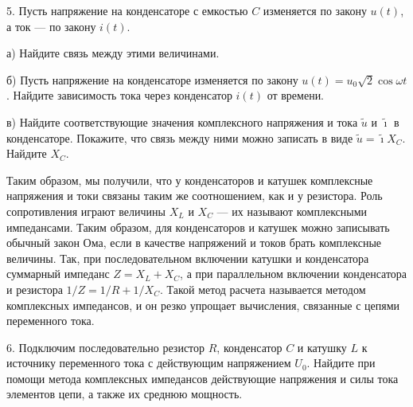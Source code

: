 \documentclass[14pt]{article}
\begin{document}
5. Пусть напряжение на конденсаторе с емкостью $C$ изменяется по закону $u(t)$, а ток --- по закону $i(t)$.

а) Найдите связь между этими величинами.

б) Пусть напряжение на конденсаторе изменяется по закону $u(t)=u_0\sqrt2 \cos\omega t$. Найдите зависимость тока через конденсатор $i(t)$ от времени.

в) Найдите соответствующие значения комплексного напряжения и тока $\tilde{u}$ и $\tilde{\imath}$ в конденсаторе. Покажите, что связь между ними можно записать в виде $\tilde{u}=\tilde{\imath}X_C$. Найдите $X_C$.

Таким образом, мы получили, что у конденсаторов и катушек комплексные напряжения и токи связаны таким же соотношением, как и у резистора. Роль сопротивления играют величины $X_L$ и $X_C$ --- их называют комплексными импедансами. Таким образом, для конденсаторов и катушек можно записывать обычный закон Ома, если в качестве напряжений и токов брать комплексные величины. Так, при последовательном включении катушки и конденсатора суммарный импеданс $Z=X_L+X_C$, а при параллельном включении конденсатора и резистора $1/Z=1/R+1/X_C$. Такой метод расчета называется методом комплексных импедансов, и он резко упрощает вычисления, связанные с цепями переменного тока.

6. Подключим последовательно резистор $R$, конденсатор $C$ и катушку $L$ к источнику переменного тока с действующим напряжением $U_0$. Найдите при помощи метода комплексных импедансов действующие напряжения и силы тока элементов цепи, а также их среднюю мощность.
\end{document}
